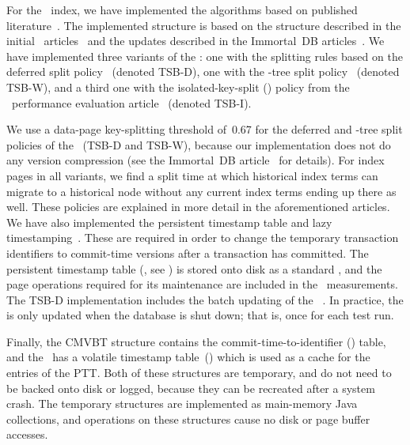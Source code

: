 For the \TSBtree\ index, we have implemented the algorithms based on
published
literature~\cite{lomet:1989:tsb,lomet:1990:tsb-performance,lomet:2005:immortaldb,lomet:2006:transactiontime,lomet:2008:version-compression,lomet:2009:improving}.
The implemented structure is based on the structure described
in the initial \TSBtree\
articles~\cite{lomet:1989:tsb,lomet:1990:tsb-performance} and the updates
described in the Immortal~DB
articles~\cite{lomet:2006:transactiontime,lomet:2008:version-compression,lomet:2009:improving}.
We have implemented three variants of the \TSBtree: 
one with the splitting rules based on the deferred split
policy~\cite{lomet:2009:improving} (denoted TSB-D),
one with the -tree split
policy~\cite{lomet:2008:version-compression} (denoted TSB-W), and 
a third one with the isolated-key-split (\abbr{IKS}) policy from the \TSBtree\
performance evaluation article~\cite{lomet:1990:tsb-performance} (denoted
TSB-I).

We use a data-page key-splitting threshold of~\num{0.67} for the
deferred and \abbr{WOB}-tree split policies of the \TSBtree\ (TSB-D and
TSB-W), because our implementation does not do any version compression (see
the Immortal~DB article~\cite{lomet:2008:version-compression} for details).
For index pages in all variants, we find a split time at which historical
index terms can migrate to a historical node without any current index terms
ending up there as well.
These policies are explained in more detail in the aforementioned
articles. 
We have also implemented the persistent timestamp table and lazy
timestamping~\cite{lomet:2005:immortaldb,lomet:2006:transactiontime}.
These are required in order to change the temporary transaction
identifiers to commit-time versions after a transaction has
committed.
The persistent timestamp table (\abbr{PTT}, see
) is stored onto disk as a standard \Btree,
and the page operations required for its maintenance are included in the
\TSBtree\ measurements.
The TSB-D implementation includes the batch updating of the
~\cite{lomet:2009:improving}. 
In practice, the \abbr{PTT} is only updated when the database is shut
down; that is, once for each test run.

Finally, the CMVBT structure contains the commit-time-to-identifier
(\abbr{CTI}) table, and the \TSBtree\ has a volatile timestamp
table~(\abbr{VTT}) which is used as a cache for the entries of the PTT\@. 
Both of these structures are temporary, and do not need to be backed
onto disk or logged, because they can be recreated after a system crash.
The temporary structures are implemented as main-memory Java
collections, and operations on these structures cause no disk or
page buffer accesses.



